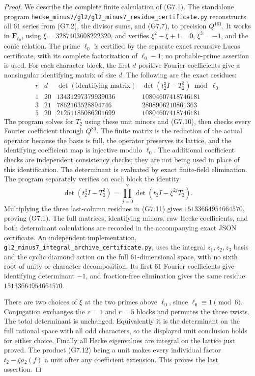 \begin{proof}
We describe the complete finite calculation of (G7.1).
The standalone program
\texttt{hecke\_minus7/gl2/gl2\_minus7\_residue\_certificate.py}
reconstructs all \(61\) series from (G7.2), the divisor sums,
and (G7.7), to precision \(Q^{161}\).
It works in \(\mathbf F_{\ell_0}\), using
\(\xi=3287403608222320\), and verifies
\(\xi^2-\xi+1=0\), \(\xi^3=-1\), and the conic relation.
The prime \(\ell_0\) is certified by the separate exact
recursive Lucas certificate, with its complete factorization
of \(\ell_0-1\); no probable-prime assertion is used.
For each character block, the first \(d\) positive
Fourier coefficients give a nonsingular identifying matrix
of size \(d\). The following are the exact residues:
\[
\begin{array}{c|r|r|r}
 r&d&\det(\text{identifying matrix})
       &\det(t_2^3I-T_2^3)\bmod\ell_0\\ \hline
 1&20&13431297379939036&10804607418746181\\
 3&21& 7862163528894746& 2808906210861363\\
 5&20&21251185086201699&10804607418746181
\end{array}
 \tag{G7.11}
\]
The program solves for \(T_2\) using these unit minors and
(G7.10), then checks every Fourier coefficient through
\(Q^{80}\). The finite matrix is the reduction of the actual
operator because the basis is full, the operator preserves
its lattice, and the identifying coefficient map is
injective modulo \(\ell_0\). The additional coefficient
checks are independent consistency checks; they are not
being used in place of this identification.
The determinant is evaluated by exact finite-field
elimination. The program separately verifies on each
block the identity
\[
 \det(t_2^3I-T_2^3)
  =\prod_{j=0}^2\det(t_2I-\xi^{2j}T_2).
 \tag{G7.12}
\]
Multiplying the three last-column residues in (G7.11)
gives \(15133664954664570\), proving (G7.1).
The full matrices, identifying minors, raw Hecke
coefficients, and both determinant calculations are
recorded in the accompanying exact JSON certificate.
An independent implementation,
\texttt{gl2\_minus7\_integral\_archive\_certificate.py},
uses the integral \(z_1,z_2,z_3\) basis and the cyclic
diamond action on the full \(61\)-dimensional space, with
no sixth root of unity or character decomposition. Its
first \(61\) Fourier coefficients give identifying
determinant \(-1\), and fraction-free elimination gives
the same residue \(15133664954664570\).

There are two choices of \(\xi\) at the two primes above
\(\ell_0\), since \(\ell_0\equiv1\pmod6\).
Conjugation exchanges the \(r=1\) and \(r=5\) blocks
and permutes the three twists. The total determinant is
unchanged. Equivalently it is the determinant on the full
rational space with all odd characters, so the displayed
unit conclusion holds for either choice.
Finally all Hecke eigenvalues are integral on the lattice
just proved. The product (G7.12) being a unit makes every
individual factor \(t_2-\zeta a_2(f)\) a unit after any
coefficient extension. This proves the last assertion.
\end{proof}
